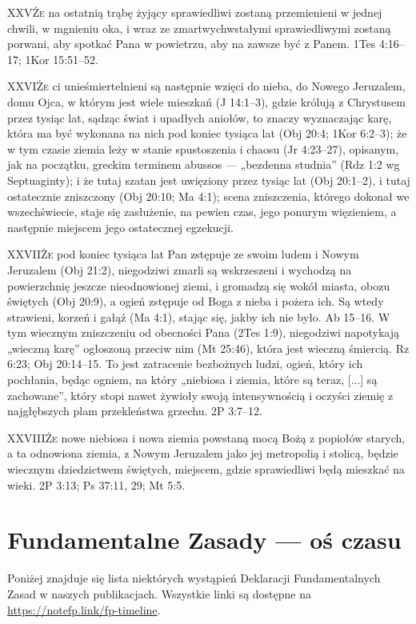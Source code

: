 \lettrine{XXV}{Że} na ostatnią trąbę żyjący sprawiedliwi zostaną przemienieni w jednej chwili, w mgnieniu oka, i wraz ze zmartwychwstałymi sprawiedliwymi zostaną porwani, aby spotkać Pana w powietrzu, aby na zawsze być z Panem. 1Tes 4:16--17; 1Kor 15:51--52.

\lettrine{XXVI}{Że} ci unieśmiertelnieni są następnie wzięci do nieba, do Nowego Jeruzalem, domu Ojca, w którym jest wiele mieszkań (J 14:1--3), gdzie królują z Chrystusem przez tysiąc lat, sądząc świat i upadłych aniołów, to znaczy wyznaczając karę, która ma być wykonana na nich pod koniec tysiąca lat (Obj 20:4; 1Kor 6:2--3); że w tym czasie ziemia leży w stanie spustoszenia i chaosu (Jr 4:23--27), opisanym, jak na początku, greckim terminem abussos — „bezdenna studnia” (Rdz 1:2 wg Septuaginty); i że tutaj szatan jest uwięziony przez tysiąc lat (Obj 20:1--2), i tutaj ostatecznie zniszczony (Obj 20:10; Ma 4:1); scena zniszczenia, którego dokonał we wszechświecie, staje się zasłużenie, na pewien czas, jego ponurym więzieniem, a następnie miejscem jego ostatecznej egzekucji.

\lettrine{XXVII}{Że} pod koniec tysiąca lat Pan zstępuje ze swoim ludem i Nowym Jeruzalem (Obj  21:2), niegodziwi zmarli są wskrzeszeni i wychodzą na powierzchnię jeszcze nieodnowionej ziemi, i gromadzą się wokół miasta, obozu świętych (Obj 20:9), a ogień zstępuje od Boga z nieba i pożera ich. Są wtedy strawieni, korzeń i gałąź (Ma 4:1), stając się, jakby ich nie było. Ab 15--16. W tym wiecznym zniszczeniu od obecności Pana (2Tes 1:9), niegodziwi napotykają „wieczną karę” ogłoszoną przeciw nim (Mt 25:46), która jest wieczną śmiercią. Rz 6:23; Obj 20:14--15. To jest zatracenie bezbożnych ludzi, ogień, który ich pochłania, będąc ogniem, na który „niebiosa i ziemia, które są teraz, [...] są zachowane”, który stopi nawet żywioły swoją intensywnością i oczyści ziemię z najgłębszych plam przekleństwa grzechu. 2P 3:7--12.

\lettrine{XXVIII}{Że} nowe niebiosa i nowa ziemia powstaną mocą Bożą z popiołów starych, a ta odnowiona ziemia, z Nowym Jeruzalem jako jej metropolią i stolicą, będzie wiecznym dziedzictwem świętych, miejscem, gdzie sprawiedliwi będą mieszkać na wieki. 2P 3:13; Ps 37:11, 29; Mt 5:5.

\section*{Fundamentalne Zasady — oś czasu} \label{appendix:timeline}

Poniżej znajduje się lista niektórych wystąpień Deklaracji Fundamentalnych Zasad w naszych publikacjach. Wszystkie linki są dostępne na \href{https://notefp.link/fp-timeline}{https://notefp.link/fp-timeline}.

